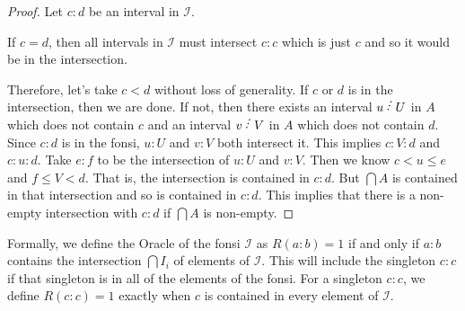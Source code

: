 \documentclass[12pt]{article}
\theoremstyle{remark}
\begin{document}
\begin{proof}
Let $c:d$ be an interval in $\mathcal{I}$. 

If $c=d$, then all intervals in $\mathcal{I}$ must intersect $c:c$ which is just $c$ and so it would be in the intersection. 

Therefore, let's take $c < d$ without loss of generality. If $c$ or $d$ is in the intersection, then we are done. If not, then there exists an interval $u\lte U$ in $A$ which does not contain $c$ and an interval $v \lte V$ in $A$ which does not contain $d$. Since $c:d$ is in the fonsi, $u:U$ and $v:V$ both intersect it. This implies $c : V : d$ and $c:u:d$. Take $e:f$ to be the intersection of $u:U$ and $v:V$. Then we know $c < u \leq e$ and $f \leq V < d$. That is, the intersection is contained in $c:d$. But $\bigcap A$ is contained in that intersection and so is contained in $c:d$. This implies that there is a non-empty intersection with $c:d$ if  $\bigcap A$ is non-empty. 

\end{proof}


Formally, we define the Oracle of the fonsi $\mathcal{I}$ as $R(a :b) = 1$ if and only if $a : b$ contains the intersection $\bigcap I_i$ of elements of $\mathcal{I}$. This will include the singleton $c:c$ if that singleton is in all of the elements of the fonsi. For a singleton $c:c$, we define $R(c:c) = 1$ exactly when $c$ is contained in every element of $\mathcal{I}$. 
\end{document}
